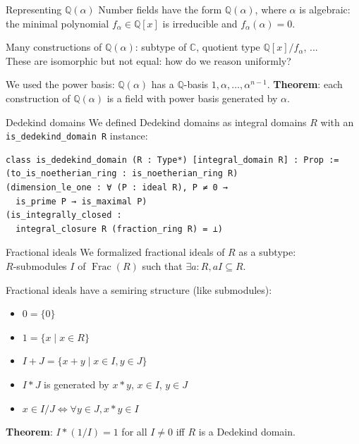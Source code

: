 \documentclass{beamer}
\newcommand{\C}{\mathbb{C}}
\newcommand{\lean}[1]{\texttt{#1}\xspace}
\newcommand{\Q}{\mathbb{Q}}
\newcommand{\Z}{\mathbb{Z}}
\DeclareMathOperator{\Frac}{Frac}
\begin{document}
%
%

\begin{frame}{Representing $\Q(\alpha)$}
	Number fields have the form $\Q(\alpha)$, where $\alpha$ is algebraic:\\
	the minimal polynomial $f_\alpha \in \Q[x]$ is irreducible and $f_\alpha(\alpha) = 0$.

	Many constructions of $\Q(\alpha)$: subtype of $\C$, quotient type $\Q[x] / f_\alpha$, ...\\
	These are isomorphic but not equal: how do we reason uniformly?

\pause
	We used the \alert{power basis}: $\Q(\alpha)$ has a $\Q$-basis $1, \alpha, \dots, \alpha^{n - 1}$.
	\textbf{Theorem}: each construction of $\Q(\alpha)$ is a field with power basis generated by $\alpha$.
\end{frame}

\begin{frame}[fragile]{Dedekind domains}
	We defined Dedekind domains as integral domains $R$ with an \lean{is\_dedekind\_domain R} instance:
\begin{lstlisting}
class is_dedekind_domain (R : Type*) [integral_domain R] : Prop :=
(to_is_noetherian_ring : is_noetherian_ring R)
(dimension_le_one : ∀ (P : ideal R), P ≠ 0 →
  is_prime P → is_maximal P)
(is_integrally_closed :
  integral_closure R (fraction_ring R) = ⊥)
\end{lstlisting}

\end{frame}

\begin{frame}{Fractional ideals}
	We formalized fractional ideals of $R$ as a subtype:\\
	$R$-submodules $I$ of $\Frac(R)$ such that $\exists a : R, a I \subseteq R$.

	Fractional ideals have a semiring structure (like submodules):\\
	\begin{itemize}
		\item $0 = \{0\}$
		\item $1 = \{x \mid x \in R\}$
		\item $I + J = \{x + y \mid x \in I, y \in J\}$
		\item $I * J$ is generated by $x * y$, $x \in I$, $y \in J$
		\item $x \in I / J \iff \forall y \in J, x * y \in I$
	\end{itemize}

\pause
	\textbf{Theorem}: $I * (1 / I) = 1$ for all $I \ne 0$ iff $R$ is a Dedekind domain.
\end{frame}
\end{document}
